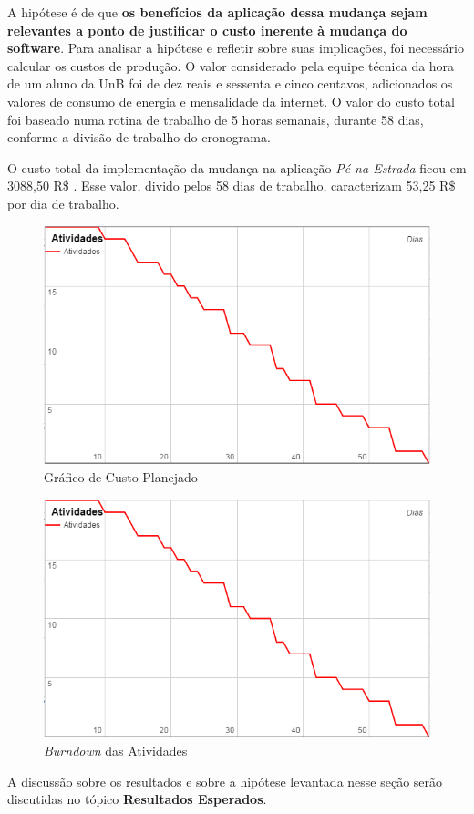 A hipótese é de que \textbf{os benefícios da aplicação dessa mudança sejam relevantes a ponto de justificar o custo inerente à mudança do software}. Para analisar a hipótese e refletir sobre suas implicações, foi necessário calcular os custos de produção. O valor considerado pela equipe técnica da hora de um aluno da UnB foi de dez reais e sessenta e cinco centavos, adicionados os valores de consumo de energia e mensalidade da internet. O valor do custo total foi baseado numa rotina de trabalho de 5 horas semanais, durante 58 dias, conforme a divisão de trabalho do cronograma.

O custo total da implementação da mudança na aplicação \textit{Pé na Estrada} ficou em 3088,50 R\$ . Esse valor, divido pelos 58 dias de trabalho, caracterizam 53,25 R\$ por dia de trabalho.

\begin{figure}[h] 
	\centering %
	\includegraphics[scale=0.7]{Figuras/grafico_atividades.png} %
	\caption{Gráfico de Custo Planejado}

\end{figure}

\begin{figure}[!h] 
	\centering %
	\includegraphics[scale=0.7]{Figuras/grafico_atividades.png} %
	\caption{\textit{Burndown} das Atividades}
	
\end{figure}


A discussão sobre os resultados e sobre a hipótese levantada nesse seção serão discutidas no tópico \textbf{Resultados Esperados}. 